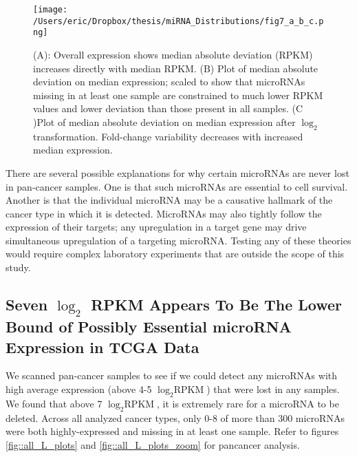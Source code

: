 \documentclass[12pt]{report}
\begin{document}
  \begin{figure}[H]
   \centering
       \texttt{[image: /Users/eric/Dropbox/thesis/miRNA\_Distributions/fig7\_a\_b\_c.png]}
        \caption{(A): Overall expression shows median absolute deviation (RPKM) increases directly with median RPKM.
        (B) Plot of median absolute deviation on median expression; scaled to 
        show that microRNAs missing in at least one sample are constrained to 
       much lower RPKM values and lower deviation than those present in all 
       samples.
         (C )Plot of median absolute deviation on median expression after $\log_{2}$ transformation.
         Fold-change variability decreases with increased median expression.}
    \label{fig::mean_on_fig}
  \end{figure}

  There are several possible explanations for why certain microRNAs are never lost in pan-cancer samples. One is that such microRNAs are essential to cell
  survival. Another is that the individual microRNA may be a causative hallmark of the cancer type in which it is detected. MicroRNAs may also tightly follow the
  expression of their targets; any upregulation in a target gene may drive simultaneous upregulation of a targeting microRNA. Testing any of these theories would
  require complex laboratory experiments that are outside the scope of this study.
  
  
\subsection*{Seven $\log_{2}$ RPKM Appears To Be The Lower Bound of Possibly Essential microRNA Expression in TCGA Data}
  We scanned pan-cancer samples to see if we could detect any microRNAs with high average expression (above 4-5 $\log_{2} \text{RPKM}$) that were lost in any samples. We found that 
  above 7 $\log_{2} \text{RPKM}$, it is extremely rare for a microRNA to be deleted. Across all analyzed cancer types, only 0-8 of more than 300 microRNAs were both highly-expressed and missing in at least one sample.
  Refer to figures \ref{fig::all_L_plots} and \ref{fig::all_L_plots_zoom} for pancancer analysis.
\end{document}
